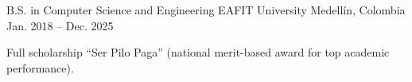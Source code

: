 
\begin{cventries}
  \cventry
    {B.S. in Computer Science and Engineering}
    {EAFIT University}
    {Medellín, Colombia}
    {Jan. 2018 -- Dec. 2025}
    {
      \begin{cvitems}
        \item {Full scholarship ``Ser Pilo Paga'' (national merit-based award for top academic performance).}
      \end{cvitems}
    }
\end{cventries}

